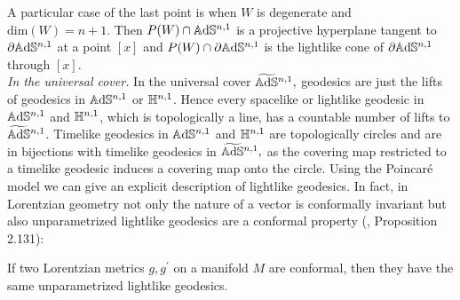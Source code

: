 A particular case of the last point is when $W$ is degenerate and $\text{dim}(W)=n+1.$ Then $P(W)\cap \mathbb{A}\mathrm{d}\mathbb{S}^{n,1}$ is a projective hyperplane tangent to $\partial\mathbb{A}\mathrm{d}\mathbb{S}^{n,1}$ at a point $[x]$ and $P(W)\cap \partial\mathbb{A}\mathrm{d}\mathbb{S}^{n,1}$ is the lightlike cone of $\partial\mathbb{A}\mathrm{d}\mathbb{S}^{n,1}$ through $[x]$.\\

\textit{In the universal cover.} In the universal cover $\widetilde{\mathbb{A}\mathrm{d}\mathbb{S}}{}^{n,1},$ geodesics are just the lifts of geodesics in $\mathbb{A}\mathrm{d}\mathbb{S}^{n,1}$ or $\mathbb{H}^{n,1}$. Hence every spacelike or lightlike geodesic in $\mathbb{A}\mathrm{d}\mathbb{S}^{n,1}$ and $\mathbb{H}^{n,1}$, which is topologically a line, has a countable number of lifts to $\widetilde{\mathbb{A}\mathrm{d}\mathbb{S}}{}^{n,1}$. Timelike geodesics in $\mathbb{A}\mathrm{d}\mathbb{S}^{n,1}$ and $\mathbb{H}^{n,1}$ are topologically circles and are in bijections with timelike geodesics in $\widetilde{\mathbb{A}\mathrm{d}\mathbb{S}}{}^{n,1},$ as the covering map restricted to a timelike geodesic induces a covering map onto the circle. Using the Poincaré model we can give an explicit description of lightlike geodesics. In fact, in Lorentzian geometry not only the nature of a vector is conformally invariant but also unparametrized lightlike geodesics are a conformal property (\cite{Gallot}, Proposition 2.131): 
 \begin{theorem}\label{ConformalMetric} If two Lorentzian metrics $g,g^{\prime} $ on a manifold $M$ are conformal, then they have the same unparametrized lightlike geodesics.
 \end{theorem}

